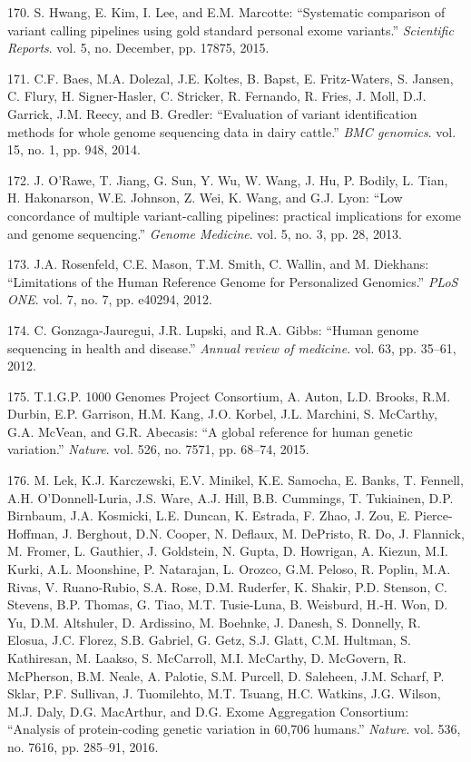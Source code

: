 \documentclass[12pt,a4paper,twoside]{ugathesis}
\theoremstyle{definition}
\theoremstyle{definition}
\theoremstyle{definition}
\theoremstyle{remark}
\begin{document}
\hypertarget{ref-Hwang2015}{}
170. S. Hwang, E. Kim, I. Lee, and E.M. Marcotte: ``Systematic
comparison of variant calling pipelines using gold standard personal
exome variants.'' \emph{Scientific Reports}. vol. 5, no. December, pp.
17875, 2015.

\hypertarget{ref-Baes2014}{}
171. C.F. Baes, M.A. Dolezal, J.E. Koltes, B. Bapst, E. Fritz-Waters, S.
Jansen, C. Flury, H. Signer-Hasler, C. Stricker, R. Fernando, R. Fries,
J. Moll, D.J. Garrick, J.M. Reecy, and B. Gredler: ``Evaluation of
variant identification methods for whole genome sequencing data in dairy
cattle.'' \emph{BMC genomics}. vol. 15, no. 1, pp. 948, 2014.

\hypertarget{ref-ORawe2013}{}
172. J. O'Rawe, T. Jiang, G. Sun, Y. Wu, W. Wang, J. Hu, P. Bodily, L.
Tian, H. Hakonarson, W.E. Johnson, Z. Wei, K. Wang, and G.J. Lyon: ``Low
concordance of multiple variant-calling pipelines: practical
implications for exome and genome sequencing.'' \emph{Genome Medicine}.
vol. 5, no. 3, pp. 28, 2013.

\hypertarget{ref-Rosenfeld2012}{}
173. J.A. Rosenfeld, C.E. Mason, T.M. Smith, C. Wallin, and M. Diekhans:
``Limitations of the Human Reference Genome for Personalized Genomics.''
\emph{PLoS ONE}. vol. 7, no. 7, pp. e40294, 2012.

\hypertarget{ref-Gonzaga-Jauregui2012}{}
174. C. Gonzaga-Jauregui, J.R. Lupski, and R.A. Gibbs: ``Human genome
sequencing in health and disease.'' \emph{Annual review of medicine}.
vol. 63, pp. 35--61, 2012.

\hypertarget{ref-1000GenomesProjectConsortium2015}{}
175. T.1.G.P. 1000 Genomes Project Consortium, A. Auton, L.D. Brooks,
R.M. Durbin, E.P. Garrison, H.M. Kang, J.O. Korbel, J.L. Marchini, S.
McCarthy, G.A. McVean, and G.R. Abecasis: ``A global reference for human
genetic variation.'' \emph{Nature}. vol. 526, no. 7571, pp. 68--74,
2015.

\hypertarget{ref-Lek2016}{}
176. M. Lek, K.J. Karczewski, E.V. Minikel, K.E. Samocha, E. Banks, T.
Fennell, A.H. O'Donnell-Luria, J.S. Ware, A.J. Hill, B.B. Cummings, T.
Tukiainen, D.P. Birnbaum, J.A. Kosmicki, L.E. Duncan, K. Estrada, F.
Zhao, J. Zou, E. Pierce-Hoffman, J. Berghout, D.N. Cooper, N. Deflaux,
M. DePristo, R. Do, J. Flannick, M. Fromer, L. Gauthier, J. Goldstein,
N. Gupta, D. Howrigan, A. Kiezun, M.I. Kurki, A.L. Moonshine, P.
Natarajan, L. Orozco, G.M. Peloso, R. Poplin, M.A. Rivas, V.
Ruano-Rubio, S.A. Rose, D.M. Ruderfer, K. Shakir, P.D. Stenson, C.
Stevens, B.P. Thomas, G. Tiao, M.T. Tusie-Luna, B. Weisburd, H.-H. Won,
D. Yu, D.M. Altshuler, D. Ardissino, M. Boehnke, J. Danesh, S. Donnelly,
R. Elosua, J.C. Florez, S.B. Gabriel, G. Getz, S.J. Glatt, C.M. Hultman,
S. Kathiresan, M. Laakso, S. McCarroll, M.I. McCarthy, D. McGovern, R.
McPherson, B.M. Neale, A. Palotie, S.M. Purcell, D. Saleheen, J.M.
Scharf, P. Sklar, P.F. Sullivan, J. Tuomilehto, M.T. Tsuang, H.C.
Watkins, J.G. Wilson, M.J. Daly, D.G. MacArthur, and D.G. Exome
Aggregation Consortium: ``Analysis of protein-coding genetic variation
in 60,706 humans.'' \emph{Nature}. vol. 536, no. 7616, pp. 285--91,
2016.
\end{document}
